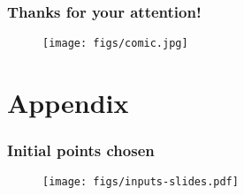 \documentclass[10pt, compress]{beamer}
\begin{document}
\begin{frame}[fragile] \frametitle{Thanks for your attention!}
    \begin{figure}[!hb] 
        \centering
        \texttt{[image: figs/comic.jpg]}
    \end{figure}
\end{frame}

\appendix

\section{Appendix}


\begin{frame}[fragile] \frametitle{Initial points chosen}
    \begin{figure}[!hb] 
        \centering
        \texttt{[image: figs/inputs-slides.pdf]}
    \end{figure}
\end{frame}
\end{document}
